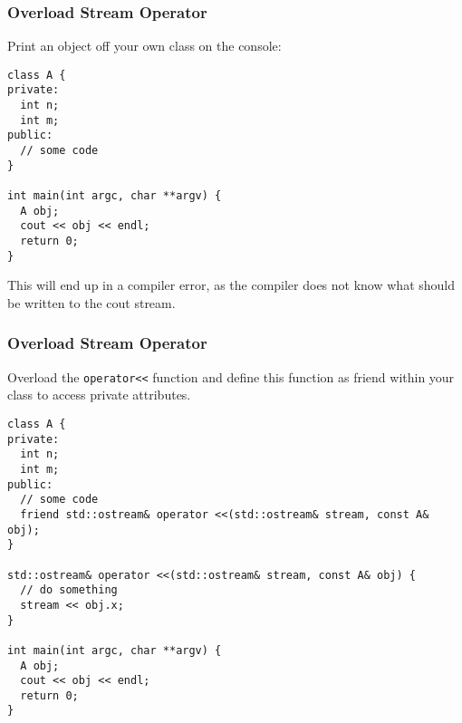 \begin{frame}[fragile]
\frametitle{Overload Stream Operator}
Print an object off your own class on the console:

{\tiny
\begin{lstlisting}
class A {
private:
  int n;
  int m;
public:
  // some code
}

int main(int argc, char **argv) {
  A obj;
  cout << obj << endl;
  return 0;
}
\end{lstlisting}
}
This will end up in a compiler error, as the compiler does not know what should be
written to the cout stream.
\end{frame}

\begin{frame}[fragile]
\frametitle{Overload Stream Operator}
Overload the \verb|operator<<| function and define this function as friend
within your class to access private attributes.

{\tiny
\begin{lstlisting}
class A {
private:
  int n;
  int m;
public:
  // some code
  friend std::ostream& operator <<(std::ostream& stream, const A& obj);
}

std::ostream& operator <<(std::ostream& stream, const A& obj) {
  // do something
  stream << obj.x;
}

int main(int argc, char **argv) {
  A obj;
  cout << obj << endl;
  return 0;
}
\end{lstlisting}
}
\end{frame}



